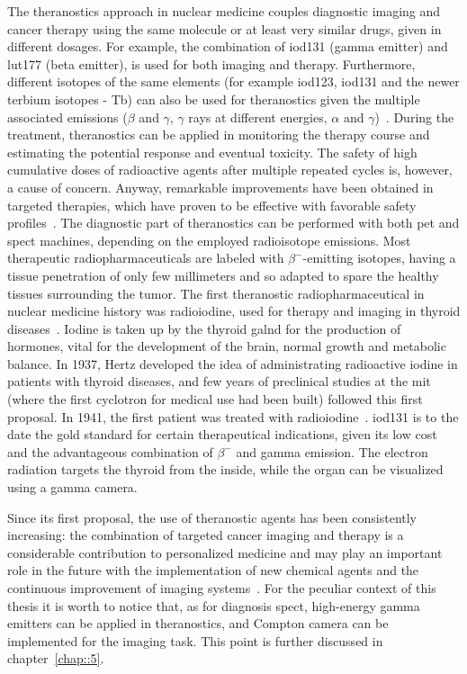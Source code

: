 The theranostics approach in nuclear medicine couples diagnostic imaging and cancer therapy using the same molecule or at least very similar drugs, given in different dosages. For example, the combination of \gls{iod131} (gamma emitter) and \gls{lut177} (beta emitter), is used for both imaging and therapy. Furthermore, different isotopes of the same elements (for example \gls{iod123}, \gls{iod131} and the newer terbium isotopes - Tb) can also be used for theranostics given the multiple associated emissions ($\beta$ and $\gamma$, $\gamma$ rays at different energies, $\alpha$ and $\gamma$)~\parencite{Gerard2002, Alzahrani2012, Muller2012}. During the treatment, theranostics can be applied in monitoring the therapy course and estimating the potential response and eventual toxicity. The safety of high cumulative doses of radioactive agents after multiple repeated cycles is, however, a cause of concern. Anyway, remarkable improvements have been obtained in targeted therapies, which have proven to be effective with favorable safety profiles~\parencite{Baum2012, Kwekkeboom2008, Strosberg2017}. The diagnostic part of theranostics can be performed with both \gls{pet} and \gls{spect} machines, depending on the employed radioisotope emissions. Most therapeutic radiopharmaceuticals are labeled with $\beta^{-}$-emitting isotopes, having a tissue penetration of only few millimeters and so adapted to spare the healthy tissues surrounding the tumor. The first theranostic radiopharmaceutical in nuclear medicine history was radioiodine, used for therapy and imaging in thyroid diseases~\parencite{Hertz2016}. Iodine is taken up by the thyroid galnd for the production of hormones, vital for the development of the brain, normal growth and metabolic balance. In 1937, Hertz developed the idea of administrating radioactive iodine in patients with thyroid diseases, and few years of preclinical studies at the \gls{mit} (where the first cyclotron for medical use had been built) followed this first proposal. In 1941, the first patient was treated with radioiodine~\parencite{Hertz1942}. \gls{iod131} is to the date the gold standard for certain therapeutical indications, given its low cost and the advantageous combination of $\beta^{-}$ and gamma emission. The electron radiation targets the thyroid from the inside, while the organ can be visualized using a gamma camera. 

Since its first proposal, the use of theranostic agents has been consistently increasing: the combination of targeted cancer imaging and therapy is a considerable contribution to personalized medicine and may play an important role in the future with the implementation of new chemical agents and the continuous improvement of imaging systems~\parencite{Yordanova2017}. For the peculiar context of this thesis it is worth to notice that, as for diagnosis \gls{spect}, high-energy gamma emitters can be applied in theranostics, and Compton camera can be implemented for the imaging task. This point is further discussed in chapter~\ref{chap::5}. 


